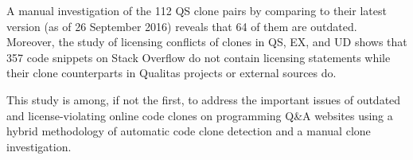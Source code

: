 \documentclass[sigconf,review, anonymous]{acmart}
\begin{document}
A manual investigation of the 112 QS clone pairs by comparing to their
latest version (as of 26 September 2016) reveals that 64 of them are
outdated. Moreover, the study of licensing conflicts of clones in QS,
EX, and UD shows that 357 code snippets on Stack Overflow do not
contain licensing statements while their clone counterparts in
Qualitas projects or external sources do.

This study is among, if not the first, to address the important issues
of outdated and license-violating online code clones on programming
Q\&A websites using a hybrid methodology of automatic code clone
detection and a manual clone investigation.

%

  

\end{document}
